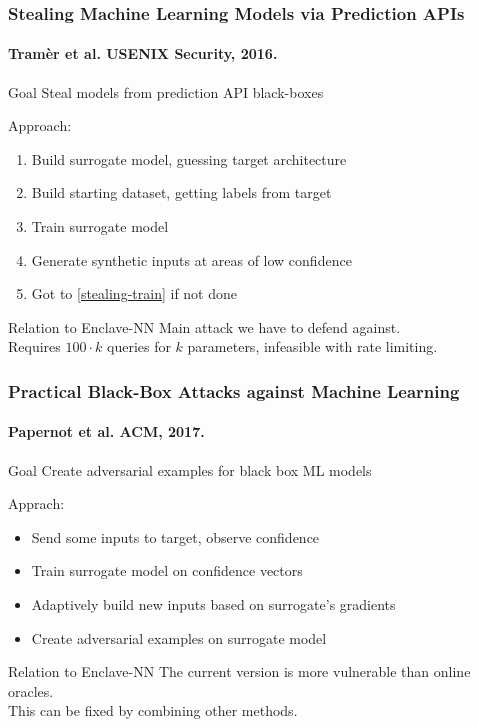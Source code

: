\documentclass[aspectratio=169,nototalframenumber]{beamer}
\begin{document}
\begin{frame}
  \frametitle{Stealing Machine Learning Models via Prediction APIs}
  \framesubtitle{\small Tramèr et al. USENIX Security, 2016.}
  \begin{block}{Goal}
    Steal models from prediction API black-boxes
  \end{block}
  \pause
  Approach:
  \begin{enumerate}
  \item Build surrogate model, guessing target architecture
  \item Build starting dataset, getting labels from target
  \item \label{stealing-train}Train surrogate model
  \item Generate synthetic inputs at areas of low confidence
  \item Got to \ref{stealing-train} if not done
  \end{enumerate}
  \pause
  \begin{alertblock}{Relation to Enclave-NN}
    Main attack we have to defend against.\\
    Requires $100 \cdot k$ queries for $k$ parameters, infeasible with rate limiting.
  \end{alertblock}
\end{frame}

\begin{frame}
  \frametitle{Practical Black-Box Attacks against Machine Learning}
  \framesubtitle{\small Papernot et al. ACM, 2017.}
  \begin{block}{Goal}
    Create adversarial examples for black box ML models
  \end{block}
  \pause
  Apprach:
  \begin{itemize}
  \item Send some inputs to target, observe confidence
  \item Train surrogate model on confidence vectors
  \item Adaptively build new inputs based on surrogate's gradients
  \item Create adversarial examples on surrogate model
  \end{itemize}
  \pause
  \begin{alertblock}{Relation to Enclave-NN}
    The current version is more vulnerable than online oracles.\\
    This can be fixed by combining other methods.
  \end{alertblock}
\end{frame}
\end{document}
